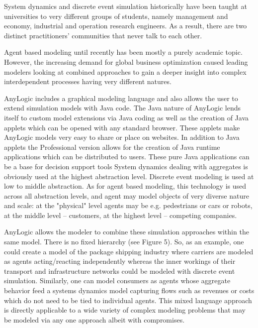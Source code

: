 System dynamics and discrete event simulation historically have been taught at universities to very different groups of students, namely management and economy, industrial and operation research engineers. As a result, there are two distinct practitioners' communities that never talk to each other.

Agent based modeling until recently has been mostly a purely academic topic. However, the increasing demand for global business optimization caused leading modelers looking at combined approaches to gain a deeper insight into complex interdependent processes having very different natures.

AnyLogic includes a graphical modeling language and also allows the user to extend simulation models with Java code. The Java nature of AnyLogic lends itself to custom model extensions via Java coding as well as the creation of Java applets which can be opened with any standard browser. These applets make AnyLogic models very easy to share or place on websites. In addition to Java applets the Professional version allows for the creation of Java runtime applications which can be distributed to users. These pure Java applications can be a base for decision support tools System dynamics dealing with aggregates is obviously used at the highest abstraction level. Discrete event modeling is used at low to middle abstraction. As for agent based modeling, this technology is used across all abstraction levels, and agent may model objects of very diverse nature and scale: at the "physical" level agents may be e.g. pedestrians or cars or robots, at the middle level – customers, at the highest level – competing companies.

AnyLogic allows the modeler to combine these simulation approaches within the same model. There is no fixed hierarchy (see Figure 5). So, as an example, one could create a model of the package shipping industry where carriers are modeled as agents acting/reacting independently whereas the inner workings of their transport and infrastructure networks could be modeled with discrete event simulation. Similarly, one can model consumers as agents whose aggregate behavior feed a systems dynamics model capturing flows such as revenues or costs which do not need to be tied to individual agents. This mixed language approach is directly applicable to a wide variety of complex modeling problems that may be modeled via any one approach albeit with compromises.
